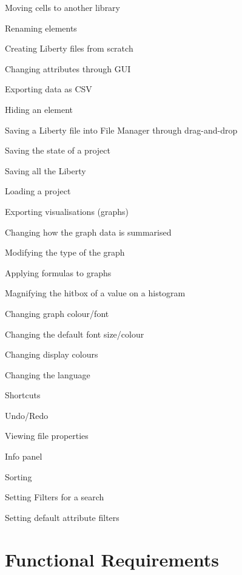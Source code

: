 \documentclass[10pt,a4paper]{report}
\begin{document}
\begin{FRO}
    \item Moving cells to another library \label{FRO-1}
    \item Renaming elements \label{FRO-2}
    \item Creating Liberty files from scratch \label{FRO-3}
    \item Changing attributes through GUI \label{FRO-4}
    \item Exporting data as CSV \label{FRO-5}
    \item Hiding an element \label{FRO-5.5}
    \item Saving a Liberty file into File Manager through drag-and-drop \label{FRO-6}
    \item Saving the state of a project \label{FRO-7}
    \item Saving all the Liberty \label{FRO-7.5} %
    \item Loading a project \label{FRO-8}
    \item Exporting visualisations (graphs) \label{FRO-9}
    \item Changing how the graph data is summarised \label{FRO-10}
    \item Modifying the type of the graph \label{FRO-11}
    \item Applying formulas to graphs \label{FRO-12}
    \item Magnifying the hitbox of a value on a histogram \label{FRO-13}
    \item Changing graph colour/font \label{FRO-14}
    \item Changing the default font size/colour \label{FRO-15}
    \item Changing display colours \label{FRO-16}
    \item Changing the language \label{FRO-17}
    \item Shortcuts \label{FRO-18}
    \item Undo/Redo \label{FRO-19}
    \item Viewing file properties \label{FRO-20}
    \item Info panel \label{20.5} %
    \item Sorting \label{FRO-21}
    \item Setting Filters for a search \label{FRO-22}
    \item Setting default attribute filters\label{FRO-23}
\end{FRO}

\section{Functional Requirements}
\end{document}
